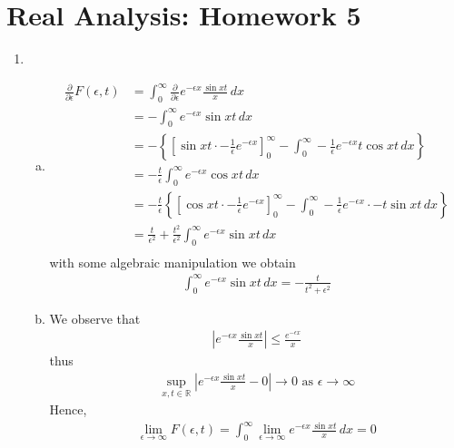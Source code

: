 \documentclass[a4paper,12pt]{article}
\theoremstyle{definition}
\begin{document}
\section*{Real Analysis: Homework 5}

\begin{enumerate}
\item 
\begin{enumerate}[(a)]
\item
\begin{align*}
\frac{\partial}{\partial \epsilon}F(\epsilon,t) &= \int_{0}^{\infty}\frac{\partial}{\partial \epsilon}e^{-\epsilon x}\frac{\sin xt}{x}\,dx\\\
&=-\int_{0}^{\infty}e^{-\epsilon x} \sin xt\, dx\\
&=-\left\{\left[\sin xt\cdot -\frac{1}{\epsilon}e^{-\epsilon x}\right]_{0}^{\infty}-\int_{0}^{\infty}-\frac{1}{\epsilon}e^{-\epsilon x} t \cos xt \, dx\right\}\\
&=-\frac{t}{\epsilon}\int_{0}^{\infty}e^{-\epsilon x} \cos xt \, dx\\
&=-\frac{t}{\epsilon}\left\{\left[\cos xt \cdot -\frac{1}{\epsilon}e^{-\epsilon x}\right]_{0}^{\infty}-\int_{0}^{\infty}-\frac{1}{\epsilon}e^{-\epsilon x}\cdot -t \sin xt \, dx\right\}\\
&=\frac{t}{\epsilon^2}+\frac{t^2}{\epsilon^2}\int_{0}^{\infty}e^{-\epsilon x} \sin xt \, dx\\
\end{align*}
with some algebraic manipulation we obtain
\begin{align*}
\int_{0}^{\infty}e^{-\epsilon x} \sin xt \, dx = -\frac{t}{t^2+\epsilon^2}
\end{align*}

\item
We observe that
\begin{align*}
\left|e^{-\epsilon x}\frac{\sin xt}{x}\right| \leq \frac{e^{-\epsilon x}}{x}
\end{align*}
thus
\begin{align*}
\sup_{x,t \in \mathbb{R}}\left|e^{-\epsilon x}\frac{\sin xt}{x} - 0\right| \to 0 \text{ as } \epsilon \to \infty 
\end{align*}
Hence,
\begin{align*}
\lim_{\epsilon \to \infty}F(\epsilon,t) = \int_{0}^{\infty}\lim_{\epsilon \to \infty}e^{-\epsilon x}\frac{\sin xt}{x}\,dx=0
\end{align*}




\end{enumerate}
\end{enumerate}
\end{document}

